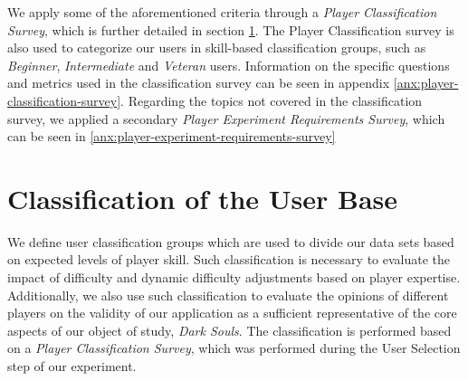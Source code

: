 We apply some of the aforementioned criteria through a \emph{Player Classification Survey}, which is further detailed in section \ref{sec:user-base-classification}. The Player Classification survey is also used to categorize our users in skill-based classification groups, such as \emph{Beginner}, \emph{Intermediate} and \emph{Veteran} users. Information on the specific questions and metrics used in the classification survey can be seen in appendix \ref{anx:player-classification-survey}. Regarding the topics not covered in the classification survey, we applied a secondary \emph{Player Experiment Requirements Survey}, which can be seen in \ref{anx:player-experiment-requirements-survey}



\section{Classification of the User Base}
\label{sec:user-base-classification}

We define user classification groups which are used to divide our data sets based on expected levels of player skill. Such classification is necessary to evaluate the impact of difficulty and dynamic difficulty adjustments based on player expertise. Additionally, we also use such classification to evaluate the opinions of different players on the validity of our application as a sufficient representative of the core aspects of our object of study, \emph{Dark Souls}. The classification is performed based on a \emph{Player Classification Survey}, which was performed during the User Selection step of our experiment.



